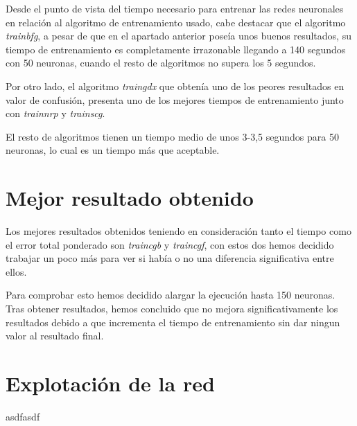 \documentclass[a4paper,12pt,titlepage]{article}
\begin{document}
Desde el punto de vista del tiempo necesario para entrenar las redes neuronales en relación al algoritmo de entrenamiento usado, cabe destacar que el algoritmo \textit{trainbfg}, a pesar de que en el apartado anterior poseía unos buenos resultados, su tiempo de entrenamiento es completamente irrazonable llegando a 140 segundos con 50 neuronas, cuando el resto de algoritmos no supera los 5 segundos. 

Por otro lado, el algoritmo \textit{traingdx} que obtenía uno de los peores resultados en valor de confusión, presenta uno de los mejores tiempos de entrenamiento junto con \textit{trainnrp} y \textit{trainscg}.

El resto de algoritmos tienen un tiempo medio de unos 3-3,5 segundos para 50 neuronas, lo cual es un tiempo más que aceptable.

\section{Mejor resultado obtenido}

Los mejores resultados obtenidos teniendo en consideración tanto el tiempo como el error total ponderado son \textit{traincgb} y \textit{traincgf}, con estos dos hemos decidido trabajar un poco más para ver si había o no una diferencia significativa entre ellos. 

Para comprobar esto hemos decidido alargar la ejecución hasta 150 neuronas. Tras obtener resultados, hemos concluido que no mejora significativamente los resultados debido a que incrementa el tiempo de entrenamiento sin dar ningun valor al resultado final.



\section{Explotación de la red}

asdfasdf

\newpage


\end{document}

